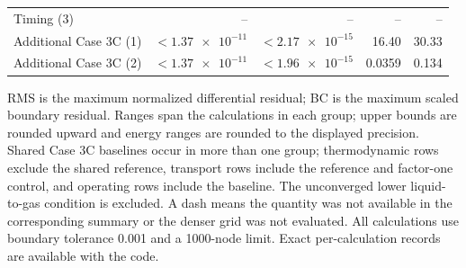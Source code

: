 \begin{table}[pos=t]
\begin{tabularx}{\textwidth}{@{}Xrrrr@{}}
Timing (3) & -- & -- & -- & -- \\
Additional Case 3C (1) & $<\num{1.37e-11}$ & $<\num{2.17e-15}$ & 16.40 & 30.33 \\
Additional Case 3C (2) & $<\num{1.37e-11}$ & $<\num{1.96e-15}$ & 0.0359 & 0.134 \\
\bottomrule
\end{tabularx}
\par\smallskip
\begin{minipage}{\textwidth}\footnotesize
RMS is the maximum normalized differential residual; BC is the maximum scaled boundary residual. Ranges span the calculations in each group; upper bounds are rounded upward and energy ranges are rounded to the displayed precision. Shared Case 3C baselines occur in more than one group; thermodynamic rows exclude the shared reference, transport rows include the reference and factor-one control, and operating rows include the baseline. The unconverged lower liquid-to-gas condition is excluded. A dash means the quantity was not available in the corresponding summary or the denser grid was not evaluated. All calculations use boundary tolerance \num{0.001} and a 1000-node limit. Exact per-calculation records are available with the code.
\end{minipage}
\end{table}
